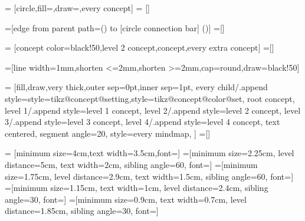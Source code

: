 




=          [circle,fill=\tikz@concept@color,draw=\tikz@concept@color,every concept]
=    []

\def\tikz@concept@color{black}

=[edge from parent path={(\tikzparentnode) to [circle connection bar] (\tikzchildnode)}]
=[]


=     [concept color=black!50,level 2 concept,concept,every extra concept]
=[]

=[line width=1mm,shorten <=2mm,shorten >=2mm,cap=round,draw=black!50]



=
  [fill,draw,very thick,outer sep=0pt,inner sep=1pt,%
   every child/.append style={style=tikz@concept@setting,style=tikz@concept@color@set},%
   root concept,
   level 1/.append style={level 1 concept},
   level 2/.append style={level 2 concept},
   level 3/.append style={level 3 concept},
   level 4/.append style={level 4 concept},
   text centered,%
   segment angle=20,
   style=every mindmap,
  ]
=[]


=   [minimum size=4cm,text width=3.5cm,font=\pgfutil@font@large]
=[minimum size=2.25cm,
                             level distance=5cm,
                             text width=2cm,
                             sibling angle=60,
                             font=\pgfutil@font@small]
=[minimum size=1.75cm,%
                             level distance=2.9cm,%
                             text width=1.5cm,%
                             sibling angle=60,%
                             font=\pgfutil@font@footnotesize]
=[minimum size=1.15cm,%
                             text width=1cm,%
                             level distance=2.4cm,%
                             sibling angle=30,%
                             font=\pgfutil@font@tiny]
=[minimum size=0.9cm,%
                             text width=0.7cm,
                             level distance=1.85cm,%
                             sibling angle=30,%
                             font=\pgfutil@font@tiny]

